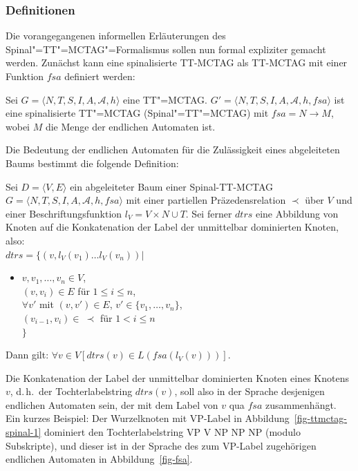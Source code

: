 \subsubsection*{Definitionen}

Die vorangegangenen informellen Erläuterungen des Spinal"=TT"=MCTAG"=Formalismus sollen nun formal expliziter gemacht werden. Zunächst kann eine spinalisierte TT-MCTAG als TT-MCTAG mit einer Funktion $f\!sa$ definiert werden: 
\begin{definition}
Sei $G = \langle N,T,S,I,A,\mathcal{A},h\rangle$ eine TT"=MCTAG. $G' = \langle N,T,S,I,A,\mathcal{A},h,f\!sa\rangle$ ist eine spinalisierte TT"=MCTAG (Spinal"=TT"=MCTAG) mit $f\!sa = N \to M$, wobei $M$ die Menge der endlichen Automaten ist.
\end{definition}
Die Bedeutung der endlichen Automaten für die Zulässigkeit eines abgeleiteten Baums bestimmt die folgende Definition:
\begin{definition}
Sei $D = \langle V,E\rangle$ ein abgeleiteter Baum einer Spinal-TT-MCTAG $G = \langle N,T,S,I,A,\mathcal{A},h,fsa\rangle$ mit einer partiellen Präzedensrelation $\prec$ über $V$ und einer Beschriftungsfunktion $l_V = V \times N \cup T$. Sei ferner $dtrs$ eine Abbildung von Knoten auf die Konkatenation der Label der unmittelbar dominierten Knoten, also: \\[-1ex]

\noindent$dtrs = \{ (v, l_V(v_1)\ldots l_V(v_n)) |$ \\[-4ex]
\begin{itemize}
  \item[] $v, v_1, \ldots, v_n \in V$, \\
  $(v,v_i) \in E$ für $1 \leq i \leq n$, \\
  $\forall v'$ mit $(v,v') \in E$, $v' \in \{v_1, \ldots, v_n\}$, \\ 
  $(v_{i-1}, v_i) \in \ \prec$ für $1 < i \leq n$ \\[1.5ex] 
  $\}$	
\end{itemize}
Dann gilt: $\forall v \in V [ dtrs(v) \in L( f\!sa(l_V(v))) ]$.
\end{definition}
Die Konkatenation der Label der unmittelbar dominierten Knoten eines Knotens $v$, d.\,h.\ der Tochterlabelstring $dtrs(v)$, soll also in der Sprache desjenigen endlichen Automaten sein, der mit dem Label von $v$ qua $f\!sa$ zusammenhängt. Ein kurzes Beispiel: Der Wurzelknoten mit VP-Label in Abbildung~\ref{fig-ttmctag-spinal-1} dominiert den Tochterlabelstring VP V NP NP NP (modulo Subskripte), und dieser ist in der Sprache des zum VP-Label zugehörigen endlichen Automaten in Abbildung~\ref{fig-fsa}.

